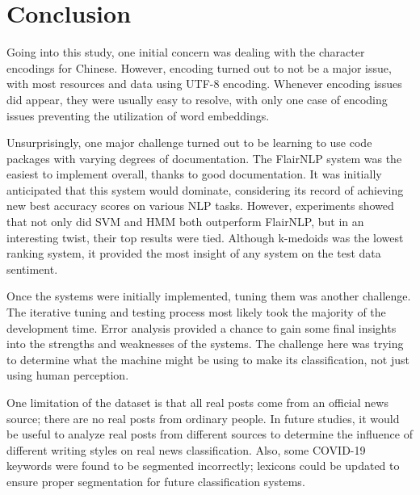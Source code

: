 \documentclass [11pt, proquest] {uwthesis}[2020/02/24]
\begin{document}
\chapter{Conclusion}

Going into this study, one initial concern was dealing with the character encodings for Chinese. However, encoding turned out to not be a major issue, with most resources and data using UTF-8 encoding. Whenever encoding issues did appear, they were usually easy to resolve, with only one case of encoding issues preventing the utilization of word embeddings. 

Unsurprisingly, one major challenge turned out to be learning to use code packages with varying degrees of documentation. The FlairNLP system was the easiest to implement overall, thanks to good documentation. It was initially anticipated that this system would dominate, considering its record of achieving new best accuracy scores on various NLP tasks. However, experiments showed that not only did SVM and HMM both outperform FlairNLP, but in an interesting twist, their top results were tied. Although k-medoids was the lowest ranking system, it provided the most insight of any system on the test data sentiment.

Once the systems were initially implemented, tuning them was another challenge. The iterative tuning and testing process most likely took the majority of the development time. Error analysis provided a chance to gain some final insights into the strengths and weaknesses of the systems. The challenge here was trying to determine what the machine might be using to make its classification, not just using human perception.

One limitation of the dataset is that all real posts come from an official news source; there are no real posts from ordinary people. In future studies, it would be useful to analyze real posts from different sources to determine the influence of different writing styles on real news classification. Also, some COVID-19 keywords were found to be segmented incorrectly; lexicons could be updated to ensure proper segmentation for future classification systems.


%
%
\nocite{*}   %


%
%
\appendix
\raggedbottom\sloppy
 
\end{document}
